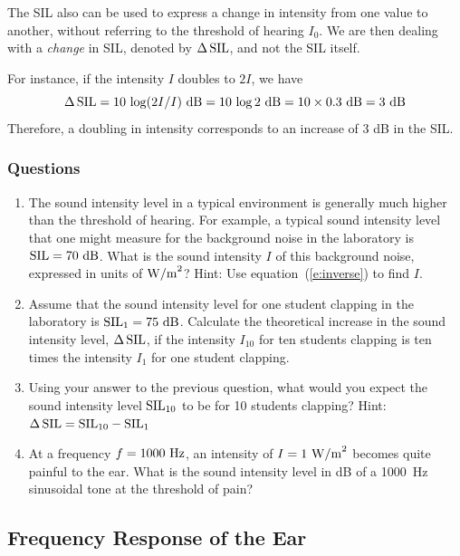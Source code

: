 \documentclass[11pt]{NSF}
\def\be{\begin{equation}}
\def\ee{\end{equation}}
\def\ben{\begin{enumerate}}
\def\een{\end{enumerate}}
\begin{document}
The SIL also can be used to express a change in intensity from one 
value to another, without referring to the threshold of hearing $I_0$. 
We are then dealing with a {\em change} in SIL, denoted by 
$\Delta\,{\rm SIL}$, and not the SIL itself. 

For instance, if the intensity $I$ doubles to $2I$, we have
%
\be
\Delta\,{\rm SIL} = 10\,\log (2I/I)~{\rm dB}
= 10\,\log 2~{\rm dB} 
= 10\times 0.3~{\rm dB} 
= 3~{\rm dB}
\ee
Therefore, a doubling in intensity corresponds to an increase of 3 dB in the SIL.

\subsubsection*{Questions}
\ben

\item
The sound intensity level in a typical environment is generally much higher 
than the threshold of hearing. 
For example, a typical sound intensity level that one might measure
for the background noise in the laboratory is ${\rm SIL}=70~{\rm dB}$.
What is the sound intensity $I$ of this background noise, expressed in 
units of ${\rm W/m}^2$? Hint: Use equation~(\ref{e:inverse}) to find $I$.

\item 
Assume that the sound intensity level for one student clapping in the
laboratory is ${\rm SIL}_1=75~{\rm dB}$. 
Calculate the theoretical increase in the sound intensity level,
$\Delta\,{\rm SIL}$, if the intensity $I_{10}$ for ten students clapping 
is ten times the intensity $I_1$ for one student clapping.

\item 
Using your answer to the previous question, what would you expect 
the sound intensity level ${\rm SIL}_{10}$ to be for 10 students 
clapping?
Hint: $\Delta\,{\rm SIL} = {\rm SIL}_{10}- {\rm SIL}_1$

\item 
At a frequency $f =1000~{\rm Hz}$, an intensity of $I = 1~{\rm W/m}^2$ 
becomes quite painful to the ear.
What is the sound intensity level in dB of a 1000~Hz sinusoidal 
tone at the threshold of pain?

\een

\subsection{Frequency Response of the Ear}
\end{document}
